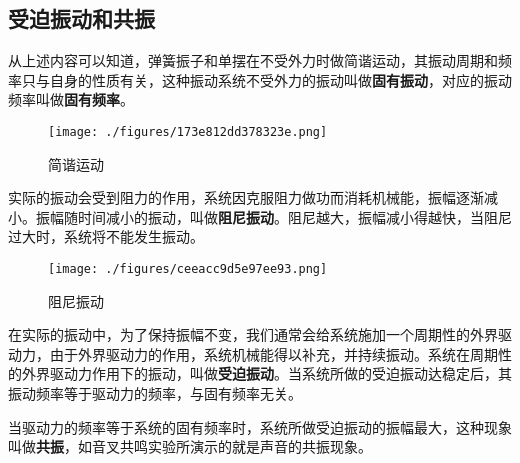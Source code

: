 \subsection{受迫振动和共振}

从上述内容可以知道，弹簧振子和单摆在不受外力时做简谐运动，其振动周期和频率只与自身的性质有关，这种振动系统不受外力的振动叫做\textbf{固有振动}，对应的振动频率叫做\textbf{固有频率}。

\begin{figure}[ht]
\centering
\texttt{[image: ./figures/173e812dd378323e.png]}
\caption{简谐运动} \label{fig_HSPM09_6}
\end{figure}


实际的振动会受到阻力的作用，系统因克服阻力做功而消耗机械能，振幅逐渐减小。振幅随时间减小的振动，叫做\textbf{阻尼振动}。阻尼越大，振幅减小得越快，当阻尼过大时，系统将不能发生振动。

\begin{figure}[ht]
\centering
\texttt{[image: ./figures/ceeacc9d5e97ee93.png]}
\caption{阻尼振动} \label{fig_HSPM09_5}
\end{figure}


在实际的振动中，为了保持振幅不变，我们通常会给系统施加一个周期性的外界驱动力，由于外界驱动力的作用，系统机械能得以补充，并持续振动。系统在周期性的外界驱动力作用下的振动，叫做\textbf{受迫振动}。当系统所做的受迫振动达稳定后，其振动频率等于驱动力的频率，与固有频率无关。

当驱动力的频率等于系统的固有频率时，系统所做受迫振动的振幅最大，这种现象叫做\textbf{共振}，如音叉共鸣实验所演示的就是声音的共振现象。

